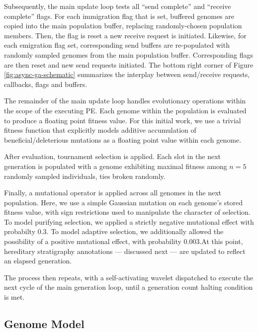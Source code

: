 Subsequently, the main update loop tests all ``send complete'' and ``receive complete'' flags.
For each immigration flag that is set, buffered genomes are copied into the main population buffer, replacing randomly-chosen population members.
Then, the flag is reset a new receive request is initiated.
Likewise, for each emigration flag set, corresponding send buffers are re-populated with randomly sampled genomes from the main population buffer.
Corresponding flags are then reset and new send requests initiated.
The bottom right corner of Figure \ref{fig:async-ga-schematic} summarizes the interplay between send/receive requests, callbacks, flags and buffers.

The remainder of the main update loop handles evolutionary operations within the scope of the executing PE.
Each genome within the population is evaluated to produce a floating point fitness value.
For this initial work, we use a trivial fitness function that explicitly models additive accumulation of beneficial/deleterious mutations as a floating point value within each genome.

After evaluation, tournament selection is applied. %
Each slot in the next generation is populated with a genome exhibiting maximal fitness among $n=5$ randomly sampled individuals, ties broken randomly.

Finally, a mutational operator is applied across all genomes in the next population.
Here, we use a simple Gaussian mutation on each genome's stored fitness value, with sign restrictions used to manipulate the character of selection.
To model purifying selection, we applied a strictly negative mutational effect with probabilty 0.3.
To model adaptive selection, we additionally allowed the possibility of a positive mutational effect, with probability 0.003.At this point, hereditary stratigraphy annotations --- discussed next --- are updated to reflect an elapsed generation.

The process then repeats, with a self-activating wavelet dispatched to execute the next cycle of the main generation loop, until a generation count halting condition is met.

\subsection{Genome Model}

